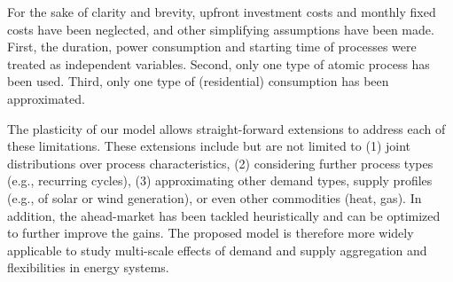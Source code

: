 \documentclass[conference]{IEEEtran}
\begin{document}
For the sake of clarity and brevity, upfront investment costs and monthly fixed costs have been neglected, and other simplifying assumptions have been made. First, the duration, power consumption and starting time of processes were treated as independent variables. Second, only one type of atomic process has been used. Third, only one type of (residential) consumption has been approximated. 


The plasticity of our model allows straight-forward extensions to address each of these limitations. These extensions include but are not limited to (1) joint distributions over process characteristics, (2) considering further process types (e.g., recurring cycles), (3) approximating other demand types, supply profiles (e.g., of solar or wind generation), or even other commodities (heat, gas). In addition, the ahead-market has been tackled heuristically and can be optimized to further improve the gains. %
The proposed model is therefore more widely applicable to study multi-scale effects of demand and supply aggregation and flexibilities in energy systems.



\balance

\end{document}
